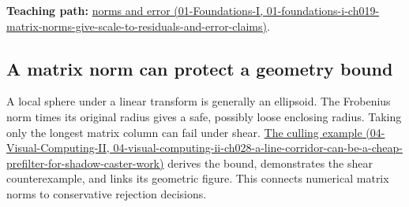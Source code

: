 \textbf{Teaching path:} \href{../01-Foundations-I/main.pdf\#nameddest=01-foundations-i-ch019-matrix-norms-give-scale-to-residuals-and-error-claims}{norms and error (01-Foundations-I, 01-foundations-i-ch019-matrix-norms-give-scale-to-residuals-and-error-claims)}.

\subsection{A matrix norm can protect a geometry bound}\label{appendix-f8657bac66e5-a-matrix-norm-can-protect-a-geometry-bound}

A local sphere under a linear transform is generally an ellipsoid. The Frobenius norm times its original radius gives a safe, possibly loose enclosing radius. Taking only the longest matrix column can fail under shear. \href{../04-Visual-Computing-II/main.pdf\#nameddest=04-visual-computing-ii-ch028-a-line-corridor-can-be-a-cheap-prefilter-for-shadow-caster-work}{The culling example (04-Visual-Computing-II, 04-visual-computing-ii-ch028-a-line-corridor-can-be-a-cheap-prefilter-for-shadow-caster-work)} derives the bound, demonstrates the shear counterexample, and links its geometric figure. This connects numerical matrix norms to conservative rejection decisions.

